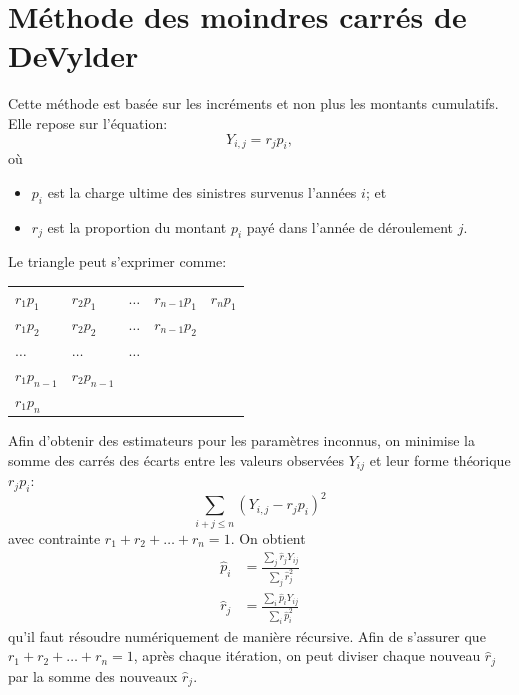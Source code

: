 \section{Méthode des moindres carrés de DeVylder}
\label{sec:deterministe:devylder}

Cette méthode est basée sur les incréments et non plus les montants
cumulatifs. Elle repose sur l'équation:
\begin{equation*}
  Y_{i,j} = r_j p_i,
\end{equation*}
où
\begin{itemize}
\item $p_i$ est la charge ultime des sinistres survenus l'années $i$;
  et
\item $r_j$ est la proportion du montant $p_i$ payé dans l'année de
  déroulement $j$.
\end{itemize}
Le triangle peut s'exprimer comme:

\begin{center}
  \begin{tabular}{|l l l l l|}\hline
    $r_1 p_1$ & $r_2 p_1$ & $\ldots$ & $r_{n-1} p_1$ & $r_n p_1$ \\
    $r_1 p_2$ & $r_2 p_2$ & $\ldots$ & $r_{n-1} p_2$ & \\
    $\ldots$ & $\ldots$ & $\ldots$ &  & \\
    $r_1 p_{n-1}$ & $r_2 p_{n-1}$ & &  & \\
    $r_1 p_n$ & & &  & \\ \hline
  \end{tabular}
\end{center}

Afin d'obtenir des estimateurs pour les paramètres inconnus, on
minimise la somme des carrés des écarts entre les valeurs observées
$Y_{ij}$ et leur forme théorique $r_j p_i$:
\begin{equation*}
  \sum_{i+j \le n } (Y_{i,j} - r_j p_i)^2
\end{equation*}
avec contrainte $r_1 + r_2 + \ldots + r_n = 1$. On obtient
\begin{align*}
  \hat{p}_{i} &= \frac{\sum_{j} \hat{r}_{j} Y_{i j}}{\sum_{j} \hat{r}_{j}^2 }\\
  \hat{r}_{j} &= \frac{\sum_{i} \hat{p}_{i} Y_{i j}}{\sum_{i} \hat{p}_{i}^2 }
\end{align*}
qu'il faut résoudre numériquement de manière récursive. Afin de
s'assurer que $r_1 + r_2 + \ldots + r_n = 1$, après chaque itération,
on peut diviser chaque nouveau $\hat{r}_{j}$ par la somme des nouveaux
$\hat{r}_{j}$.

